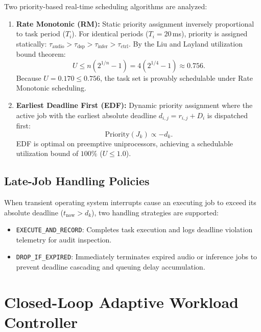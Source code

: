 \documentclass[10pt,twocolumn,letterpaper]{article}
\begin{document}
Two priority-based real-time scheduling algorithms are analyzed:
\begin{enumerate}
    \item \textbf{Rate Monotonic (RM):} Static priority assignment inversely proportional to task period ($T_i$). For identical periods ($T_i = 20$\,ms), priority is assigned statically: $\tau_{\text{audio}} > \tau_{\text{dsp}} > \tau_{\text{infer}} > \tau_{\text{ctrl}}$. By the Liu and Layland utilization bound theorem:
    \begin{equation}
        U \le n(2^{1/n} - 1) = 4(2^{1/4} - 1) \approx 0.756.
    \end{equation}
    Because $U = 0.170 \le 0.756$, the task set is provably schedulable under Rate Monotonic scheduling.
    \item \textbf{Earliest Deadline First (EDF):} Dynamic priority assignment where the active job with the earliest absolute deadline $d_{i,j} = r_{i,j} + D_i$ is dispatched first:
    \begin{equation}
        \text{Priority}(J_k) \propto -d_k.
    \end{equation}
    EDF is optimal on preemptive uniprocessors, achieving a schedulable utilization bound of $100\%$ ($U \le 1.0$).
\end{enumerate}

\subsection{Late-Job Handling Policies}

When transient operating system interrupts cause an executing job to exceed its absolute deadline ($t_{\text{now}} > d_k$), two handling strategies are supported:
\begin{itemize}
    \item \texttt{EXECUTE\_AND\_RECORD}: Completes task execution and logs deadline violation telemetry for audit inspection.
    \item \texttt{DROP\_IF\_EXPIRED}: Immediately terminates expired audio or inference jobs to prevent deadline cascading and queuing delay accumulation.
\end{itemize}

\section{Closed-Loop Adaptive Workload Controller}
\end{document}
